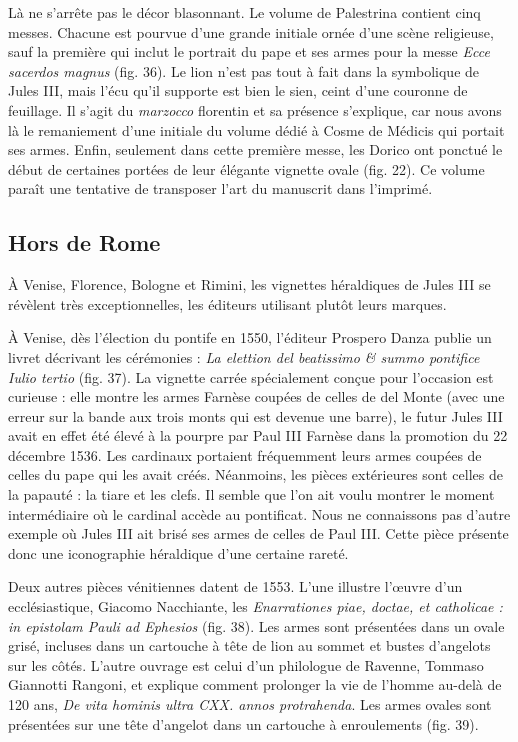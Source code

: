 \documentclass[12pt,twoside,openany]{book}
\begin{document}
Là ne s’arrête pas le décor blasonnant. Le volume de Palestrina contient cinq messes. Chacune est pourvue d’une grande initiale ornée d’une scène religieuse, sauf la première qui inclut le portrait du pape et ses armes pour la messe \textit{Ecce sacerdos magnus} (fig. 36). Le lion n’est pas tout à fait dans la symbolique de Jules III, mais l’écu qu’il supporte est bien le sien, ceint d’une couronne de feuillage. Il s’agit du \textit{marzocco} florentin et sa présence s’explique, car nous avons là le remaniement d’une initiale du volume dédié à Cosme de Médicis qui portait ses armes. Enfin, seulement dans cette première messe, les Dorico ont ponctué le début de certaines portées de leur élégante vignette ovale (fig. 22). Ce volume paraît une tentative de transposer l’art du manuscrit dans l’imprimé.

\subsection{Hors de Rome}

À Venise, Florence, Bologne et Rimini, les vignettes héraldiques de Jules III se révèlent très exceptionnelles, les éditeurs utilisant plutôt leurs marques.

À Venise, dès l’élection du pontife en 1550, l’éditeur Prospero Danza publie un livret décrivant les cérémonies : \textit{La elettion del beatissimo \& summo pontifice Iulio tertio} (fig. 37). La vignette carrée spécialement conçue pour l’occasion est curieuse : elle montre les armes Farnèse coupées de celles de del Monte (avec une erreur sur la bande aux trois monts qui est devenue une barre), le futur Jules III avait en effet été élevé à la pourpre par Paul III Farnèse dans la promotion du 22 décembre 1536. Les cardinaux portaient fréquemment leurs armes coupées de celles du pape qui les avait créés. Néanmoins, les pièces extérieures sont celles de la papauté : la tiare et les clefs. Il semble que l’on ait voulu montrer le moment intermédiaire où le cardinal accède au pontificat. Nous ne connaissons pas d’autre exemple où Jules III ait brisé ses armes de celles de Paul III. Cette pièce présente donc une iconographie héraldique d’une certaine rareté.

Deux autres pièces vénitiennes datent de 1553. L’une illustre l’œuvre d’un ecclésiastique, Giacomo Nacchiante, les \textit{Enarrationes piae, doctae, et catholicae : in epistolam Pauli ad Ephesios} (fig. 38). Les armes sont présentées dans un ovale grisé, incluses dans un cartouche à tête de lion au sommet et bustes d’angelots sur les côtés. L’autre ouvrage est celui d’un philologue de Ravenne, Tommaso Giannotti Rangoni, et explique comment prolonger la vie de l’homme au-delà de 120 ans, \textit{De vita hominis ultra CXX. annos protrahenda}. Les armes ovales sont présentées sur une tête d’angelot dans un cartouche à enroulements (fig. 39).
\end{document}
